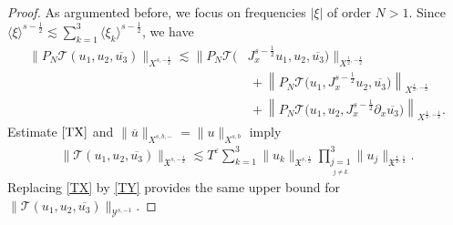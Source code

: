 \documentclass[reqno]{amsart}
\theoremstyle{Definitionl}
\theoremstyle{Definitionk}
\theoremstyle{definition}
\theoremstyle{Satzk}
\theoremstyle{Satzl}
\theoremstyle{Bemerkung}
\begin{document}
\begin{proof}
As argumented before, we focus on frequencies $|\xi|$ of order $N>1$. Since $\langle\xi\rangle^{s-\frac12}
\lesssim \sum_{k=1}^3\langle\xi_k\rangle^{s-\frac12}$, we have
\begin{align*}
\|P_N\mathcal T(u_1,u_2,\overline{u_3})\|_{X^{s,-\frac12}}
\lesssim \Big\|P_N\mathcal T\big(&J_x^{s-\frac12}u_1,u_2,\overline{u_3}\big)\Big\|_{X^{\frac12,-\frac12}}\\
&\,+ \left\|P_N\mathcal T\big(u_1,J_x^{s-\frac12}u_2,\overline{u_3}\big)\right\|_{X^{\frac12,-\frac12}}\\
&\,+ \left\|P_N{\mathcal T\big(u_1,u_2,J_x^{s-\frac12}\partial_x\overline{u_3}\big)}\right\|_{X^{\frac12,-\frac12}}.
\end{align*}
Estimate $\eqref{TX}$ and $\|\overline u\|_{X^{s,b,-}}=\|u\|_{X^{s,b}}$ imply
\begin{align*}
\|\mathcal T(u_1,u_2,\overline{u_3})\|_{\mathfrak X^{s,-\frac12}}\lesssim T^\varepsilon \sum_{k=1}^3\|u_k\|_{\mathfrak X^{s,\frac12}}\prod_{\underset{j\ne k}{j=1}}^3\|u_j\|_{\mathfrak X^{\frac12,\frac12}}.
\end{align*}
Replacing \eqref{TX} by \eqref{TY} provides the same upper bound for $\|\mathcal T(u_1,u_2,\overline{u_3})\|_{\mathcal Y^{s,-1}}$.
\end{proof}
\end{document}
